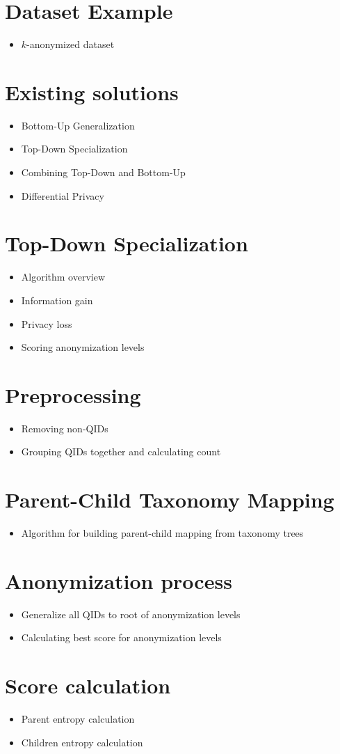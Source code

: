 \documentclass[11pt]{article}       %
\newenvironment{slide}[1]        {\section{#1} \begin{itemize}}%
                                 {\end{itemize}}
\begin{document}
\begin{slide}{Dataset Example}
\item $k$-anonymized dataset
\end{slide}

\begin{slide}{Existing solutions}
\item Bottom-Up Generalization
\item Top-Down Specialization
\item Combining Top-Down and Bottom-Up
\item Differential Privacy
\end{slide}

\begin{slide}{Top-Down Specialization}
\item Algorithm overview
\item Information gain
\item Privacy loss
\item Scoring anonymization levels
\end{slide}

\begin{slide}{Preprocessing}
\item Removing non-QIDs
\item Grouping QIDs together and calculating count
\end{slide}

\begin{slide}{Parent-Child Taxonomy Mapping}
\item Algorithm for building parent-child mapping from taxonomy trees
\end{slide}

\begin{slide}{Anonymization process}
\item Generalize all QIDs to root of anonymization levels
\item Calculating best score for anonymization levels
\end{slide}

\begin{slide}{Score calculation}
\item Parent entropy calculation
\item Children entropy calculation
\end{slide}
\end{document}
